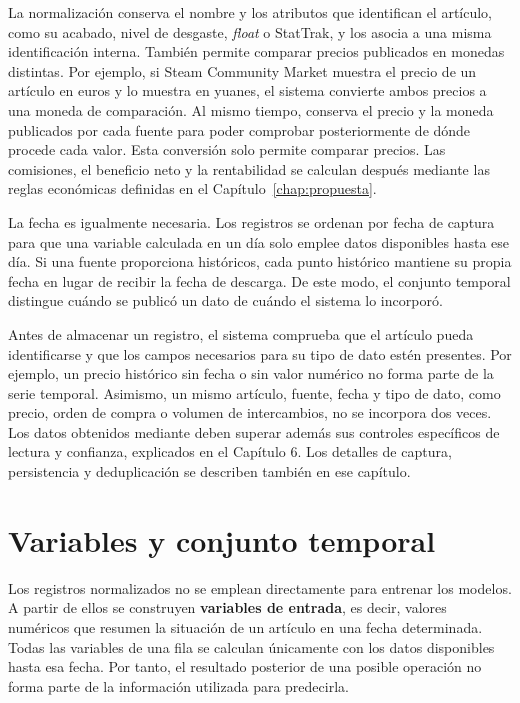 La normalización conserva el nombre y los atributos que identifican el artículo, como su acabado, nivel de desgaste, \textit{float} o StatTrak, y los asocia a una misma identificación interna. También permite comparar precios publicados en monedas distintas. Por ejemplo, si Steam Community Market muestra el precio de un artículo en euros y  lo muestra en yuanes, el sistema convierte ambos precios a una moneda de comparación. Al mismo tiempo, conserva el precio y la moneda publicados por cada fuente para poder comprobar posteriormente de dónde procede cada valor. Esta conversión solo permite comparar precios. Las comisiones, el beneficio neto y la rentabilidad se calculan después mediante las reglas económicas definidas en el Capítulo~\ref{chap:propuesta}.

La fecha es igualmente necesaria. Los registros se ordenan por fecha de captura para que una variable calculada en un día solo emplee datos disponibles hasta ese día. Si una fuente proporciona históricos, cada punto histórico mantiene su propia fecha en lugar de recibir la fecha de descarga. De este modo, el conjunto temporal distingue cuándo se publicó un dato de cuándo el sistema lo incorporó.

Antes de almacenar un registro, el sistema comprueba que el artículo pueda identificarse y que los campos necesarios para su tipo de dato estén presentes. Por ejemplo, un precio histórico sin fecha o sin valor numérico no forma parte de la serie temporal. Asimismo, un mismo artículo, fuente, fecha y tipo de dato, como precio, orden de compra o volumen de intercambios, no se incorpora dos veces. Los datos obtenidos mediante  deben superar además sus controles específicos de lectura y confianza, explicados en el Capítulo 6. Los detalles de captura, persistencia y deduplicación se describen también en ese capítulo.

\section{Variables y conjunto temporal}

Los registros normalizados no se emplean directamente para entrenar los modelos. A partir de ellos se construyen \textbf{variables de entrada}, es decir, valores numéricos que resumen la situación de un artículo en una fecha determinada. Todas las variables de una fila se calculan únicamente con los datos disponibles hasta esa fecha. Por tanto, el resultado posterior de una posible operación no forma parte de la información utilizada para predecirla.

